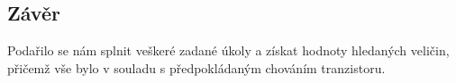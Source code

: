 \documentclass[czech,11pt,a4paper]{article}
\begin{document}
\begin{multicols}{2}
	\section{Závěr}
	Podařilo se nám splnit veškeré zadané úkoly a získat hodnoty hledaných veličin, přičemž vše bylo v souladu s předpokládaným chováním tranzistoru.
	
	


	

	
\end{multicols}
\end{document}
